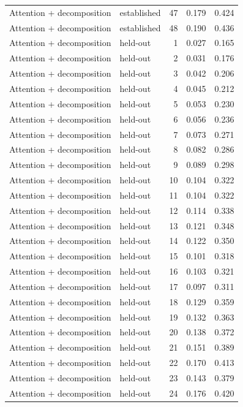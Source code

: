 \begin{tabular}{llrrr}
Attention + decomposition & established & 47 & 0.179 & 0.424 \\
Attention + decomposition & established & 48 & 0.190 & 0.436 \\
Attention + decomposition & held-out & 1 & 0.027 & 0.165 \\
Attention + decomposition & held-out & 2 & 0.031 & 0.176 \\
Attention + decomposition & held-out & 3 & 0.042 & 0.206 \\
Attention + decomposition & held-out & 4 & 0.045 & 0.212 \\
Attention + decomposition & held-out & 5 & 0.053 & 0.230 \\
Attention + decomposition & held-out & 6 & 0.056 & 0.236 \\
Attention + decomposition & held-out & 7 & 0.073 & 0.271 \\
Attention + decomposition & held-out & 8 & 0.082 & 0.286 \\
Attention + decomposition & held-out & 9 & 0.089 & 0.298 \\
Attention + decomposition & held-out & 10 & 0.104 & 0.322 \\
Attention + decomposition & held-out & 11 & 0.104 & 0.322 \\
Attention + decomposition & held-out & 12 & 0.114 & 0.338 \\
Attention + decomposition & held-out & 13 & 0.121 & 0.348 \\
Attention + decomposition & held-out & 14 & 0.122 & 0.350 \\
Attention + decomposition & held-out & 15 & 0.101 & 0.318 \\
Attention + decomposition & held-out & 16 & 0.103 & 0.321 \\
Attention + decomposition & held-out & 17 & 0.097 & 0.311 \\
Attention + decomposition & held-out & 18 & 0.129 & 0.359 \\
Attention + decomposition & held-out & 19 & 0.132 & 0.363 \\
Attention + decomposition & held-out & 20 & 0.138 & 0.372 \\
Attention + decomposition & held-out & 21 & 0.151 & 0.389 \\
Attention + decomposition & held-out & 22 & 0.170 & 0.413 \\
Attention + decomposition & held-out & 23 & 0.143 & 0.379 \\
Attention + decomposition & held-out & 24 & 0.176 & 0.420 \\

\end{tabular}
